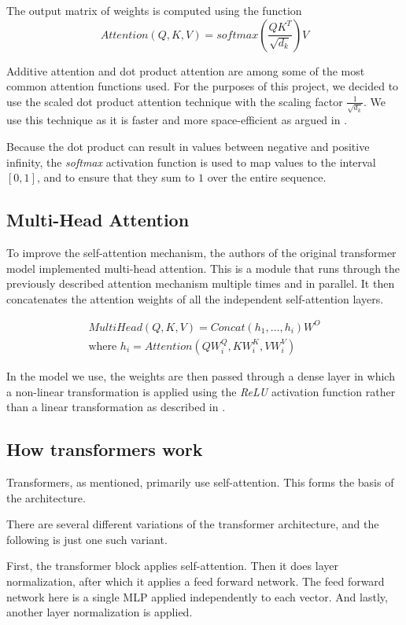 The output matrix of weights is computed using the function
$$
Attention(Q, K, V) = softmax(\frac{QK^T}{\sqrt{d_k}})V
$$

Additive attention and dot product attention are among some of the most common attention functions used.
For the purposes of this project, we decided to use the scaled dot product attention technique with the scaling factor $\frac{1}{\sqrt{d_k}}$.
We use this technique as it is faster and more space-efficient as argued in \citet{AttentionIsAllYouNeed}.

Because the dot product can result in values between negative and positive infinity, the \textit{softmax} activation function is used to map values to the interval $[0,1]$, and to ensure that they sum to $1$ over the entire sequence.

\subsection{Multi-Head Attention}
To improve the self-attention mechanism, the authors of the original transformer model implemented multi-head attention.
This is a module that runs through the previously described attention mechanism multiple times and in parallel.
It then concatenates the attention weights of all the independent self-attention layers. 

\begin{align*}
MultiHead(Q, K, V) = Concat(h_1, \ldots, h_i)W^O \\
\text{where }h_i = Attention(QW^Q_i, KW^K_i, VW^V_i) 
\end{align*}

In the model we use, the weights are then passed through a dense layer in which a non-linear transformation is applied using the \textit{ReLU} activation function rather than a linear transformation as described in \citet{AttentionIsAllYouNeed}.


\subsection{How transformers work}
Transformers, as mentioned, primarily use self-attention. This forms the basis of the architecture.

There are several different variations of the transformer architecture, and the following is just one such variant.

First, the transformer block applies self-attention. Then it does layer normalization, after which it applies a feed forward network. The feed forward network here is a single MLP applied independently to each vector. And lastly, another layer normalization is applied.

